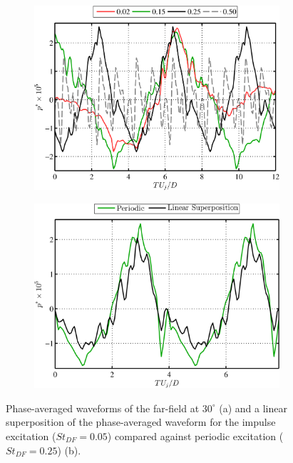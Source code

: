 \begin{figure}
	\centering
	\begin{subfigure}{.5\textwidth}
		\centering
		\includegraphics[width=0.95\linewidth]{Figures/ch3_farfield_phavg.png}
		\caption{}
		\label{fig:ch3_farfield_phavg}
	\end{subfigure}%
	\begin{subfigure}{.5\textwidth}
		\centering
		\includegraphics[width=0.95\linewidth]{Figures/ch3_farfield_linear.png}
		\caption{}
		\label{fig:ch3_farfield_linear}
	\end{subfigure}
	\caption{Phase-averaged waveforms of the far-field at $30^\circ$ (a) and a linear superposition of the phase-averaged waveform for the impulse excitation ($St_{DF} = 0.05$) compared against periodic excitation ($St_{DF} = 0.25$) (b).}
	\label{fig:ch3_nearfield}
\end{figure}

